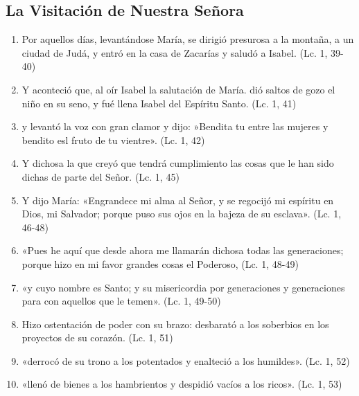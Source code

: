 \documentclass[a4paper,11pt]{article}
\begin{document}
    \subsection*{\hfil La Visitación de Nuestra Señora \hfil}
      
      \begin{enumerate}
        
        \item Por aquellos días, levantándose María, se dirigió presurosa a la montaña, a un ciudad de Judá, y entró en la casa
        de Zacarías y saludó a Isabel. (Lc. 1, 39-40)
        
        \item Y aconteció que, al oír Isabel la salutación de María. dió saltos de gozo el niño en su seno, y fué llena Isabel del Espíritu Santo. (Lc. 1, 41)
        
        \item y levantó la voz con gran clamor y dijo: »Bendita tu entre las mujeres y bendito esl fruto de tu vientre». (Lc. 1, 42)
        
        \item Y dichosa la que creyó que tendrá cumplimiento las cosas que le han sido dichas de parte del Señor. (Lc. 1, 45)
        
        \item Y dijo María: «Engrandece mi alma al Señor, y se regocijó mi espíritu en Dios, mi Salvador;
        porque puso sus ojos en la bajeza de su esclava». (Lc. 1, 46-48)

        \item «Pues he aquí que desde ahora me llamarán dichosa todas las generaciones; 
        porque hizo en mi favor grandes cosas el Poderoso, (Lc. 1, 48-49)
        
        \item «y cuyo nombre es Santo; y su misericordia por generaciones y generaciones para con aquellos que le temen». (Lc. 1, 49-50)
        
        \item Hizo ostentación de poder con su brazo: desbarató a los soberbios en los proyectos de su corazón. (Lc. 1, 51)
        
        \item «derrocó de su trono a los potentados y enalteció a los humildes». (Lc. 1, 52)
        
        \item «llenó de bienes a los hambrientos y despidió vacíos a los ricos». (Lc. 1, 53)

      \end{enumerate}
            
\end{document}
